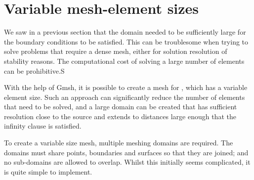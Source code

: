 \section{Variable mesh-element sizes}
We saw in a previous section that the domain needed to be sufficiently
large for the boundary conditions to be satisfied. This can be troublesome when
trying to solve problems that require a dense mesh, either for solution
resolution of stability reasons. The computational cost of solving a large
number of elements can be prohibitive.S

With the help of Gmsh, it is possible to create a mesh for \esc, which has a
variable element size. Such an approach can significantly reduce the number of
elements that need to be solved, and a large domain can be created that has
sufficient resolution close to the source and extends to distances large enough
that the infinity clause is satisfied.

To create a variable size mesh, multiple meshing domains are required. The
domains must share points, boundaries and surfaces so that they are joined; and
no sub-domains are allowed to overlap. Whilst this initially seems complicated,
it is quite simple to implement. 

